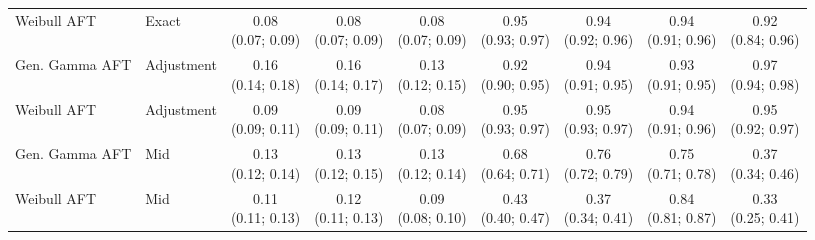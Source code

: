 \begin{table*}[htbp]
\begin{sideways}
\begin{tabular}{llccccccc}
\addlinespace
Weibull AFT & Exact & \makecell{0.08\\(0.07; 0.09)} & \makecell{0.08\\(0.07; 0.09)} & \makecell{0.08\\(0.07; 0.09)} & \makecell{0.95\\(0.93; 0.97)} & \makecell{0.94\\(0.92; 0.96)} & \makecell{0.94\\(0.91; 0.96)} & \makecell{0.92\\(0.84; 0.96)} \\
\addlinespace
Gen. Gamma AFT & Adjustment & \makecell{0.16\\(0.14; 0.18)} & \makecell{0.16\\(0.14; 0.17)} & \makecell{0.13\\(0.12; 0.15)} & \makecell{0.92\\(0.90; 0.95)} & \makecell{0.94\\(0.91; 0.95)} & \makecell{0.93\\(0.91; 0.95)} & \makecell{0.97\\(0.94; 0.98)} \\
\addlinespace
Weibull AFT & Adjustment & \makecell{0.09\\(0.09; 0.11)} & \makecell{0.09\\(0.09; 0.11)} & \makecell{0.08\\(0.07; 0.09)} & \makecell{0.95\\(0.93; 0.97)} & \makecell{0.95\\(0.93; 0.97)} & \makecell{0.94\\(0.91; 0.96)} & \makecell{0.95\\(0.92; 0.97)} \\
\addlinespace
Gen. Gamma AFT & Mid & \makecell{0.13\\(0.12; 0.14)} & \makecell{0.13\\(0.12; 0.15)} & \makecell{0.13\\(0.12; 0.14)} & \makecell{0.68\\(0.64; 0.71)} & \makecell{0.76\\(0.72; 0.79)} & \makecell{0.75\\(0.71; 0.78)} & \makecell{0.37\\(0.34; 0.46)} \\
\addlinespace
Weibull AFT & Mid & \makecell{0.11\\(0.11; 0.13)} & \makecell{0.12\\(0.11; 0.13)} & \makecell{0.09\\(0.08; 0.10)} & \makecell{0.43\\(0.40; 0.47)} & \makecell{0.37\\(0.34; 0.41)} & \makecell{0.84\\(0.81; 0.87)} & \makecell{0.33\\(0.25; 0.41)} \\

\end{tabular}
\end{sideways}
\end{table*}
